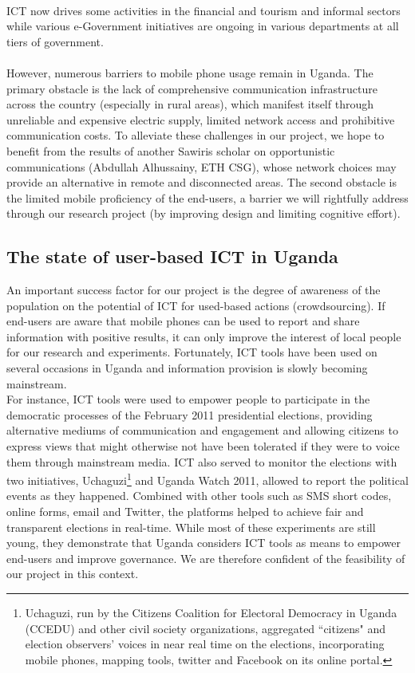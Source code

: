 \documentclass[11pt]{article}
\begin{document}
\\
ICT now drives some activities in the financial and tourism and informal sectors while various e-Government initiatives are ongoing in various departments at all tiers of government\cite{Nora10}\cite{Post11}. 
\\\\
However, numerous barriers to mobile phone usage remain in Uganda. The primary obstacle is the lack of comprehensive communication infrastructure across the country (especially in rural areas), which manifest itself through unreliable and expensive electric supply, limited network access and prohibitive communication costs. To alleviate these challenges in our project, we hope to benefit from the results of another Sawiris scholar on opportunistic communications (Abdullah Alhussainy, ETH CSG), whose network choices may provide an alternative in remote and disconnected areas. The second obstacle is the limited mobile proficiency of the end-users, a barrier we will rightfully address through our research project (by improving design and limiting cognitive effort). 

\subsection{The state of user-based ICT in Uganda}
An important success factor for our project is the degree of awareness of the population on the potential of ICT for used-based actions (crowdsourcing). If end-users are aware that mobile phones can be used to report and share information with positive results, it can only improve the interest of local people for our research and experiments. Fortunately, ICT tools have been used on several occasions in Uganda and information provision is slowly becoming mainstream.
\\
For instance, ICT tools were used to empower people to participate in the democratic processes of the February 2011 presidential elections\cite{Post11}, providing alternative mediums of communication and engagement and allowing citizens to express views that might otherwise not have been tolerated if they were to voice them through mainstream media\cite{Post11}\cite{ Ashnah12}. ICT also served to monitor the elections with two initiatives, Uchaguzi\footnote{Uchaguzi, run by the Citizens Coalition for Electoral Democracy in Uganda (CCEDU) and other civil society organizations, aggregated ``citizens" and election observers' voices in near real time on the elections, incorporating mobile phones, mapping tools, twitter and Facebook on its online portal\cite{Post11}.} and Uganda Watch 2011, allowed to report the political events as they happened. Combined with other tools such as SMS short codes, online forms, email and Twitter, the platforms helped to achieve fair and transparent elections in real-time\cite{Post11}\cite{ Ashnah12}.
While most of these experiments are still young, they demonstrate that Uganda considers ICT tools as means to empower end-users and improve governance. We are therefore confident of the feasibility of our project in this context.
\end{document}
